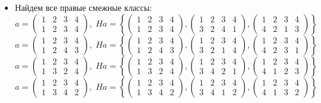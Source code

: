 \documentclass[a4paper,12pt]{article}
\begin{document}
\begin{itemize}
\item Найдем все правые смежные классы:
\[a = \begin{pmatrix} 1 & 2 & 3 & 4 \\ 1&2&3&4\end{pmatrix}, \; Ha = \left\{\begin{pmatrix} 1 & 2 & 3 & 4 \\ 1&2&3&4\end{pmatrix}, \begin{pmatrix} 1 & 2 & 3 & 4 \\ 3&2&4&1\end{pmatrix}, \begin{pmatrix} 1 & 2 & 3 & 4 \\ 4&2&1&3\end{pmatrix} \right\}\]
\[a = \begin{pmatrix} 1 & 2 & 3 & 4 \\ 1&2&4&3\end{pmatrix}, \; Ha = \left\{\begin{pmatrix} 1 & 2 & 3 & 4 \\ 1&2&4&3\end{pmatrix}, \begin{pmatrix} 1 & 2 & 3 & 4 \\ 3&2&1&4\end{pmatrix}, \begin{pmatrix} 1 & 2 & 3 & 4 \\ 4&2&3&1\end{pmatrix} \right\}\]
\[a = \begin{pmatrix} 1 & 2 & 3 & 4 \\ 1&3&2&4\end{pmatrix}, \; Ha = \left\{\begin{pmatrix} 1 & 2 & 3 & 4 \\ 1&3&2&4\end{pmatrix}, \begin{pmatrix} 1 & 2 & 3 & 4 \\ 3&4&2&1\end{pmatrix}, \begin{pmatrix} 1 & 2 & 3 & 4 \\ 4&1&2&3\end{pmatrix} \right\}\]
\[a = \begin{pmatrix} 1 & 2 & 3 & 4 \\ 1&3&4&2\end{pmatrix}, \; Ha = \left\{\begin{pmatrix} 1 & 2 & 3 & 4 \\ 1&3&4&2\end{pmatrix}, \begin{pmatrix} 1 & 2 & 3 & 4 \\ 3&4&1&2\end{pmatrix}, \begin{pmatrix} 1 & 2 & 3 & 4 \\ 4&1&3&2\end{pmatrix} \right\}\]

\end{itemize}
\end{document}
